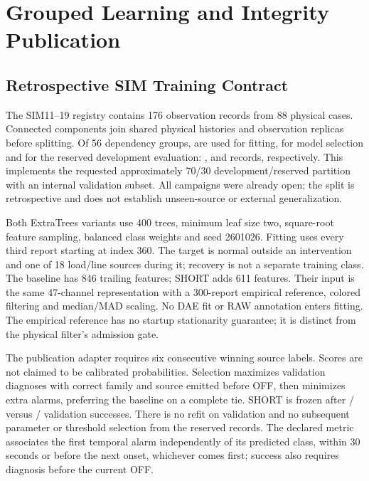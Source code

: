 \section{Grouped Learning and Integrity Publication}
\label{app:grouped-learning}

\subsection{Retrospective SIM Training Contract}
The SIM11--19 registry contains 176 observation records from 88 physical
cases. Connected components join shared physical histories and observation
replicas before splitting. Of 56 dependency groups, \MLTrainGroups{} are
used for fitting, \MLValGroups{} for model selection and \MLHoldGroups{}
for the reserved development evaluation: \MLTrainRecords{},
\MLValRecords{} and \MLHoldRecords{} records, respectively. This implements
the requested approximately 70/30 development/reserved partition with an
internal validation subset. All campaigns were already open; the split is
retrospective and does not establish unseen-source or external generalization.

Both ExtraTrees variants use 400 trees, minimum leaf size two, square-root
feature sampling, balanced class weights and seed 2601026. Fitting uses
every third report starting at index 360. The target is normal outside an
intervention and one of 18 load/line sources during it; recovery is not a
separate training class. The baseline has 846 trailing features; SHORT adds
611 features. Their input is the same 47-channel representation with a
300-report empirical reference, colored filtering and median/MAD scaling.
No DAE fit or RAW annotation enters fitting. The empirical reference has no
startup stationarity guarantee; it is distinct from the physical filter's
admission gate.

The publication adapter requires six consecutive winning source labels.
Scores are not claimed to be calibrated probabilities. Selection maximizes
validation diagnoses with correct family and source emitted before OFF,
then minimizes extra alarms, preferring the baseline on a complete tie.
SHORT is frozen after \MLShortValTimely{}/\MLShortValEvents{} versus
\MLBaseValTimely{}/\MLBaseValEvents{} validation successes. There is no
refit on validation and no subsequent parameter or threshold selection
from the reserved \MLHoldRecords{} records. The declared metric associates
the first temporal alarm independently of its predicted class, within
30 seconds or before the next onset, whichever comes first; success also
requires diagnosis before the current OFF.

